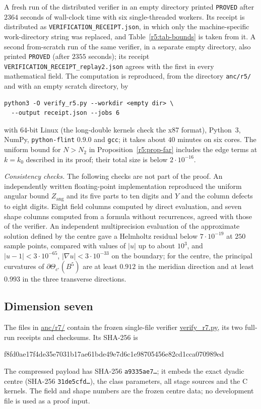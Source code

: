 \documentclass[11pt]{amsart}
\theoremstyle{definition}
\theoremstyle{remark}
\numberwithin{equation}{section}
\begin{document}
{\sloppy A fresh run of the distributed verifier in an empty directory printed \texttt{PROVED} after $2364$ seconds of wall-clock time with six single-threaded workers. Its receipt is distributed as \texttt{VERIFICATION\_RECEIPT.json}, in which only the machine-specific work-directory string was replaced, and Table~\ref{r5:tab-bounds} is taken from it. A second from-scratch run of the same verifier, in a separate empty directory, also printed \texttt{PROVED} (after $2355$ seconds); its receipt \texttt{VERIFICATION\_RECEIPT\_replay2.json} agrees with the first in every mathematical field. The computation is reproduced, from the directory \texttt{anc/r5/} and with an empty scratch directory, by\par}
\begin{verbatim}
python3 -O verify_r5.py --workdir <empty dir> \
  --output receipt.json --jobs 6
\end{verbatim}
{\sloppy\noindent with 64-bit Linux (the long-double kernels check the x87 format), Python~3, NumPy, \texttt{python-flint} 0.9.0 and \texttt{gcc}; it takes about $40$ minutes on six cores. The uniform bound for $N>N_2$ in Proposition~\ref{r5:prop-far} includes the edge terms at $k=k_0$ described in its proof; their total size is below $2\cdot10^{-16}$.\par}

\emph{Consistency checks.} The following checks are not part of the proof. An independently written floating-point implementation reproduced the uniform angular bound $Z_{\mathrm{ang}}$ and its five parts to ten digits and $Y$ and the column defects to eight digits. Eight field columns computed by direct evaluation, and seven shape columns computed from a formula without recurrences, agreed with those of the verifier. An independent multiprecision evaluation of the approximate solution defined by the centre gave a Helmholtz residual below $7\cdot10^{-19}$ at $250$ sample points, compared with values of $|u|$ up to about $10^3$, and $|u-1|<3\cdot10^{-65}$, $|\nabla u|<3\cdot10^{-33}$ on the boundary; for the centre, the principal curvatures of $\partial\Theta_{c^\circ}(B^5)$ are at least $0.912$ in the meridian direction and at least $0.993$ in the three transverse directions.

\subsection{Dimension seven}\label{r7:sec-cap}
The files in \url{anc/r7/} contain the frozen single-file verifier \url{verify_r7.py}, its two full-run receipts and checksums. Its SHA-256 is
\begin{center}\ttfamily\small
f8fd0ae17f4de35e7031b17ae61bde49e7d6c1e98705456e82cd1cca070989ed
\end{center}
The compressed payload has SHA-256 \texttt{a9335ae7\ldots}; it embeds the exact dyadic centre (SHA-256 \texttt{31de5cfd\ldots}), the class parameters, all stage sources and the C kernels. The field and shape numbers are the frozen centre data; no development file is used as a proof input.
\end{document}
